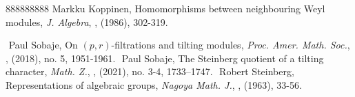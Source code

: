 \documentclass[twoside,11pt,reqno]{amsart}
\newcommand{\0}{\bar 0}
\newcommand{\1}{\bar 1}
\theoremstyle{definition}
\numberwithin{equation}{subsection}
\begin{document}
\begin{thebibliography}{888888888}
 Markku Koppinen, Homomorphisms between neighbouring Weyl modules, {\em J. Algebra}, {}, (1986), 302-319.

﻿
 Paul Sobaje, On $(p,r)$-filtrations and tilting modules,  {\em Proc. Amer. Math. Soc.}, {}, (2018), no. 5, 1951-1961.
﻿
  Paul Sobaje, The Steinberg quotient of a tilting character, {\em Math. Z.}, {}, (2021), no. 3-4, 1733–1747.
﻿
 Robert Steinberg, Representations of algebraic groups, {\em Nagoya Math. J.}, {}, (1963), 33-56. 
﻿
﻿
\end{thebibliography}
﻿
\end{document}
